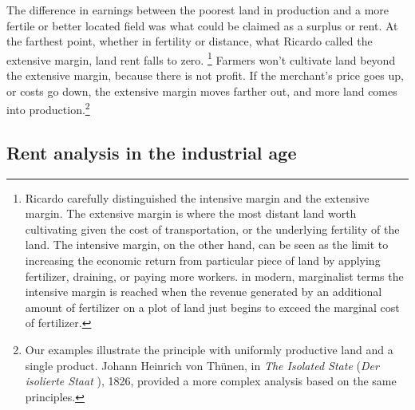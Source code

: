 The difference in earnings between the poorest land in production and a more fertile or better located field was what could be claimed as a surplus or rent. %
At the farthest point, whether in fertility or distance, what Ricardo called the \gls{extensive margin}, land \gls{rent} falls to zero. 
\footnote{Ricardo carefully distinguished the \gls{intensive margin} and the \gls{extensive margin}. The extensive margin is where the most distant land worth cultivating given the cost of transportation, or the underlying fertility of the land. The intensive margin, on the other hand, can be seen as the limit to increasing the economic return from  particular piece of land by applying fertilizer, draining, or paying more workers. in modern, \gls{marginalist} terms the intensive margin is reached when the revenue generated by an additional amount of fertilizer on a plot of land just begins to exceed the marginal cost of fertilizer.} 
Farmers won't cultivate land beyond the extensive margin, because there is not profit. %
If the merchant's price goes up, or costs go down, the \gls{extensive margin} moves farther out, and more land comes into production.\footnote{Our examples illustrate the principle with %
uniformly productive land and a single product. Johann Heinrich von Th\"unen, in \textit{The Isolated State} (\textit{Der isolierte Staat} \cite{vonthunenIsolirteStaatBeziehung1826}), 1826, provided a more complex analysis based on the same principles.} %

\subsection{Rent analysis in the industrial age} 
